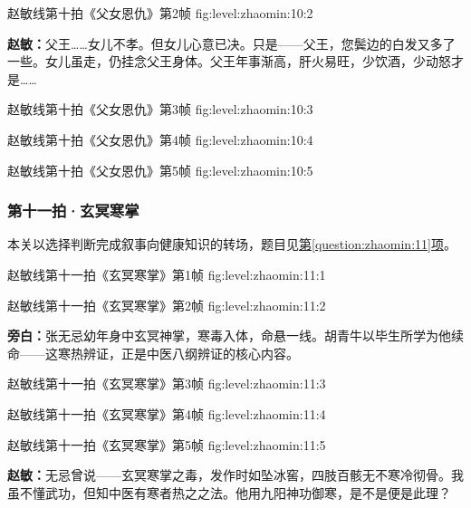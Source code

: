   {赵敏线第十拍《父女恩仇》第2帧}
  {fig:level:zhaomin:10:2}
  {\scriptsize}
  {\textbf{赵敏：}父王……女儿不孝。但女儿心意已决。只是——父王，您鬓边的白发又多了一些。女儿虽走，仍挂念父王身体。父王年事渐高，肝火易旺，少饮酒，少动怒才是……\par}

  {赵敏线第十拍《父女恩仇》第3帧}
  {fig:level:zhaomin:10:3}
  {\scriptsize}
  {\mbox{}}

\clearpage

  {赵敏线第十拍《父女恩仇》第4帧}
  {fig:level:zhaomin:10:4}
  {\scriptsize}
  {\mbox{}}

  {赵敏线第十拍《父女恩仇》第5帧}
  {fig:level:zhaomin:10:5}
  {\scriptsize}
  {\mbox{}}

\subsubsection{第十一拍·玄冥寒掌}\label{plot:zhaomin:11}
本关以选择判断完成叙事向健康知识的转场，题目见\hyperref[question:zhaomin:11]{第\ref*{question:zhaomin:11}项}。

  {赵敏线第十一拍《玄冥寒掌》第1帧}
  {fig:level:zhaomin:11:1}
  {\scriptsize}
  {\mbox{}}

\clearpage

  {赵敏线第十一拍《玄冥寒掌》第2帧}
  {fig:level:zhaomin:11:2}
  {\scriptsize}
  {\textbf{旁白：}张无忌幼年身中玄冥神掌，寒毒入体，命悬一线。胡青牛以毕生所学为他续命——这寒热辨证，正是中医八纲辨证的核心内容。\par}

  {赵敏线第十一拍《玄冥寒掌》第3帧}
  {fig:level:zhaomin:11:3}
  {\scriptsize}
  {\mbox{}}

  {赵敏线第十一拍《玄冥寒掌》第4帧}
  {fig:level:zhaomin:11:4}
  {\scriptsize}
  {\mbox{}}

\clearpage

  {赵敏线第十一拍《玄冥寒掌》第5帧}
  {fig:level:zhaomin:11:5}
  {\scriptsize}
  {\textbf{赵敏：}无忌曾说——玄冥寒掌之毒，发作时如坠冰窖，四肢百骸无不寒冷彻骨。我虽不懂武功，但知中医有寒者热之之法。他用九阳神功御寒，是不是便是此理？\par}

